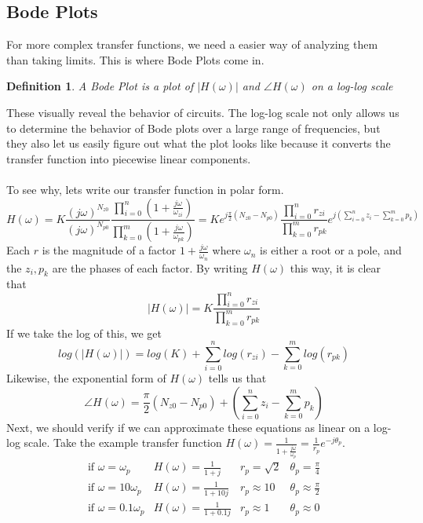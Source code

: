 \documentclass{article}
\newtheorem{definition}{Definition}
\begin{document}
\subsection{Bode Plots}
For more complex transfer functions, we need a easier way of analyzing them than taking limits. This is where Bode Plots come in.
\begin{definition}
    A Bode Plot is a plot of $|H(\omega)|$ and $\angle H(\omega)$ on a log-log scale
\end{definition}
These visually reveal the behavior of circuits. The log-log scale not only allows us to determine the behavior of Bode plots over a large range of frequencies,
but they also let us easily figure out what the plot looks like because it converts the transfer function into piecewise linear components.
\\\\To see why, lets write our transfer function in polar form. 
$$H(\omega) = K \frac{(j\omega)^{N_{z0}}}{(j\omega)^{N_{p0}}}\frac{\prod_{i=0}^{n}{(1+\frac{j\omega}{\omega_{zi}})}}{\prod_{k=0}^{m}{(1+\frac{j\omega}{\omega_{pk}})}} = Ke^{j\frac{\pi}{2}(N_{z0}-N_{p0})} \frac{\prod_{i=0}^{n}{r_{zi}}}{\prod_{k=0}^{m}{r_{pk}}} e^{j(\sum_{i=0}^{n}{z_i} - \sum_{k=0}^{m}{p_k})}$$
Each $r$ is the magnitude of a factor $1 + \frac{j\omega}{\omega_n}$ where $\omega_n$ is either a root or a pole, and the $z_i, p_k$ are the phases of each factor.
By writing $H(\omega)$ this way, it is clear that $$|H(\omega)| = K \frac{\prod_{i=0}^{n}{r_{zi}}}{\prod_{k=0}^{m}{r_{pk}}}$$
If we take the log of this, we get $$log(|H(\omega)|) = log(K) + \sum_{i=0}^{n}{log(r_{zi})} - \sum_{k=0}^{m}{log(r_{pk})}$$
Likewise, the exponential form of $H(\omega)$ tells us that $$\angle H(\omega) = \frac{\pi}{2}(N_{z0}-N_{p0})+ (\sum_{i=0}^{n}{z_i} - \sum_{k=0}^{m}{p_k})$$
Next, we should verify if we can approximate these equations as linear on a log-log scale.
Take the example transfer function $H(\omega) = \frac{1}{1+\frac{j\omega}{\omega_p}} = \frac{1}{r_p}e^{-j\theta_p}$.
\[
    \begin{array}{cccc}
        \text{if } \omega = \omega_p & H(\omega) = \frac{1}{1+j} & r_p = \sqrt{2} & \theta_p = \frac{\pi}{4}\\
        \text{if } \omega = 10\omega_p & H(\omega) = \frac{1}{1+10j} & r_p \approx 10 & \theta_p \approx \frac{\pi}{2}\\
        \text{if } \omega = 0.1\omega_p & H(\omega) = \frac{1}{1+0.1j} & r_p \approx 1 & \theta_p \approx 0\\
    \end{array}
\]
\end{document}
